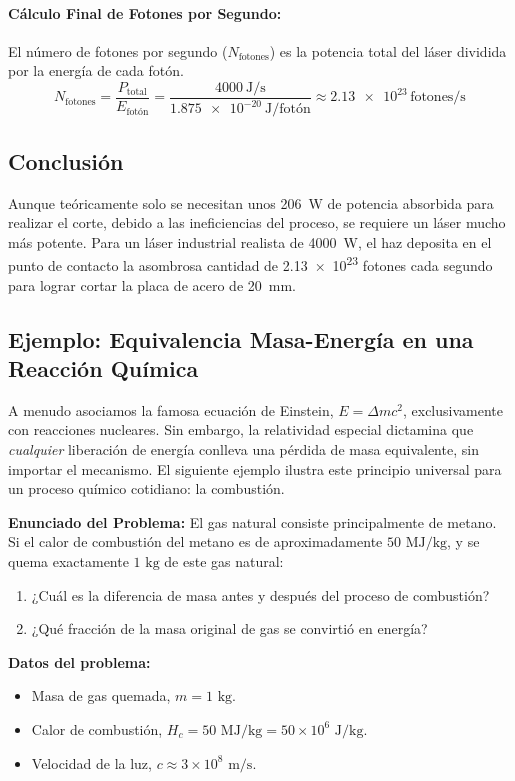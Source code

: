 \documentclass[11pt,a4paper]{book}
\begin{document}
\paragraph{Cálculo Final de Fotones por Segundo:}
El número de fotones por segundo ($N_{\text{fotones}}$) es la potencia total del láser dividida por la energía de cada fotón.
\[ N_{\text{fotones}} = \frac{P_{\text{total}}}{E_{\text{fotón}}} = \frac{\SI{4000}{\joule\per\second}}{\SI{1.875e-20}{\joule\per\text{fotón}}} \approx \num{2.13e23} \, \text{fotones/s} \]

\subsection*{Conclusión}
Aunque teóricamente solo se necesitan unos \SI{206}{\watt} de potencia absorbida para realizar el corte, debido a las ineficiencias del proceso, se requiere un láser mucho más potente. Para un láser industrial realista de \SI{4000}{\watt}, el haz deposita en el punto de contacto la asombrosa cantidad de \num{2.13e23} fotones cada segundo para lograr cortar la placa de acero de \SI{20}{\milli\meter}.

\subsection{Ejemplo: Equivalencia Masa-Energía en una Reacción Química}

A menudo asociamos la famosa ecuación de Einstein, $E = \Delta m c^2$, exclusivamente con reacciones nucleares. Sin embargo, la relatividad especial dictamina que \textit{cualquier} liberación de energía conlleva una pérdida de masa equivalente, sin importar el mecanismo. El siguiente ejemplo ilustra este principio universal para un proceso químico cotidiano: la combustión.

\textbf{Enunciado del Problema:}
El gas natural consiste principalmente de metano. Si el calor de combustión del metano es de aproximadamente $50 \text{ MJ/kg}$, y se quema exactamente $1 \text{ kg}$ de este gas natural:
\begin{enumerate}
    \item ¿Cuál es la diferencia de masa antes y después del proceso de combustión?
    \item ¿Qué fracción de la masa original de gas se convirtió en energía?
\end{enumerate}

\textbf{Datos del problema:}
\begin{itemize}
    \item Masa de gas quemada, $m = 1 \text{ kg}$.
    \item Calor de combustión, $H_c = 50 \text{ MJ/kg} = 50 \times 10^6 \text{ J/kg}$.
    \item Velocidad de la luz, $c \approx 3 \times 10^8 \text{ m/s}$.
\end{itemize}
\end{document}
